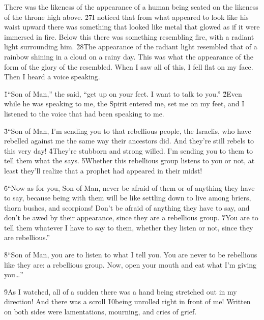 There was the likeness of the appearance of a human being seated on the likeness of the throne high above. \v{27}I noticed that from what appeared to look like his waist upward there was something that looked like metal that glowed as if it were immersed in fire. Below this there was something resembling fire, with a radiant light surrounding him. \v{28}The appearance of the radiant light resembled that of a rainbow shining in a cloud on a rainy day. This was what the appearance of the form of the glory of the  resembled. When I saw all of this, I fell flat on my face. Then I heard a voice speaking.

\v{1}``Son of Man,'' the  said, ``get up on your feet. I want to talk to you.'' \v{2}Even while he was speaking to me, the Spirit entered me, set me on my feet, and I listened to the voice that had been speaking to me.

\v{3}``Son of Man, I'm sending you to that rebellious people, the Israelis, who have rebelled against me the same way their ancestors did. And they're still rebels to this very day! \v{4}They're stubborn and strong willed. I'm sending you to them to tell them what the  says. \v{5}Whether this rebellious group listens to you or not, at least they'll realize that a prophet had appeared in their midst!

\v{6}``Now as for you, Son of Man, never be afraid of them or of anything they have to say, because being with them will be like settling down to live among briers, thorn bushes, and scorpions! Don't be afraid of anything they have to say, and don't be awed by their appearance, since they are a rebellious group. \v{7}You are to tell them whatever I have to say to them, whether they listen or not, since they are rebellious.''

\v{8}``Son of Man, you are to listen to what I tell you. You are never to be rebellious like they are: a rebellious group. Now, open your mouth and eat what I'm giving you{\ldots}''

\v{9}As I watched, all of a sudden there was a hand being stretched out in my direction! And there was a scroll \v{10}being unrolled right in front of me! Written on both sides were lamentations, mourning, and cries of grief.

